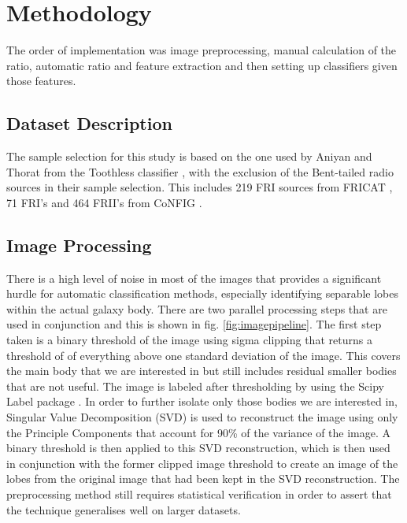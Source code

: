 \documentclass[conference]{IEEEtran}
\begin{document}
\section{Methodology}
The order of implementation was image preprocessing, manual calculation of the ratio, automatic ratio and feature extraction and then setting up classifiers given those features.

\subsection{Dataset Description}
The sample selection for this study is based on the one used by Aniyan and Thorat from the Toothless classifier \cite{aniyan_thorat_2017}, with the exclusion of the Bent-tailed radio sources in their sample selection. This includes 219 FRI sources from FRICAT \cite{capetti_2016}, 71 FRI's and 464 FRII's from CoNFIG \cite{gendre_wall_2009}.
\subsection{Image Processing}
There is a high level of noise in most of the images that provides a significant hurdle for automatic classification methods, especially identifying separable lobes within the actual galaxy body. There are two parallel processing steps that are used in conjunction and this is shown in fig. \ref{fig:imagepipeline}. The first step taken is a binary threshold of the image using sigma clipping that returns a threshold of of everything above one standard deviation of the image. This covers the main body that we are interested in but still includes residual smaller bodies that are not useful. The image is labeled after thresholding by using the Scipy Label package \cite{scipy}. In order to further isolate only those bodies we are interested in, Singular Value Decomposition (SVD) is used to reconstruct the image using only the Principle Components that account for 90\% of the variance of the image. A binary threshold is then applied to this SVD reconstruction, which is then used in conjunction with the former clipped image threshold to create an image of the lobes from the original image that had been kept in the SVD reconstruction. The preprocessing method still requires statistical verification in order to assert that the technique generalises well on larger datasets. 
\end{document}
